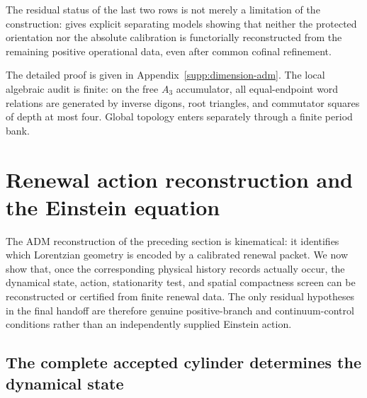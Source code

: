 \documentclass[11pt]{article}
\theoremstyle{definition}
\theoremstyle{remark}
\begin{document}
The residual status of the last two rows is not merely a limitation of the
construction:  gives explicit
separating models showing that neither the protected orientation nor the
absolute calibration is functorially reconstructed from the remaining
positive operational data, even after common cofinal refinement.

The detailed proof is given in Appendix~\ref{supp:dimension-adm}.  The local algebraic audit is
finite: on the free $A_3$ accumulator, all equal-endpoint word relations are
generated by inverse digons, root triangles, and commutator squares of depth at
most four.  Global topology enters separately through a finite period bank.

\section{Renewal action reconstruction and the Einstein equation}
\label{sec:einstein-dynamics}

The ADM reconstruction of the preceding section is kinematical: it identifies
which Lorentzian geometry is encoded by a calibrated renewal packet.  We now
show that, once the corresponding physical history records actually occur, the
dynamical state, action, stationarity test, and spatial compactness screen can
be reconstructed or certified from finite renewal data.  The only residual
hypotheses in the final handoff are therefore genuine positive-branch and
continuum-control conditions rather than an independently supplied Einstein
action.

\subsection{The complete accepted cylinder determines the dynamical state}
\end{document}
